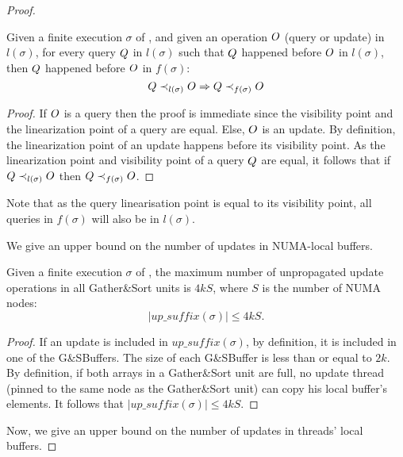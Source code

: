 \begin{proof}
\begin{lemma}\label{Lem: op_order}
Given a finite execution $\sigma$ of \mysketch, and given an operation $\mathnormal{O}$ (query or update) in $l(\sigma)$, for every query $\mathnormal{Q}$ in $l(\sigma)$ such that $\mathnormal{Q}$ happened before $\mathnormal{O}$ in \(l(\sigma)\), then $\mathnormal{Q}$ happened before $\mathnormal{O}$ in \(f(\sigma)\):  \[\mathnormal{Q} \prec_{l(\sigma)}\mathnormal{O} \Rightarrow  \mathnormal{Q} \prec_{f(\sigma)} \mathnormal{O}\]
\end{lemma}
\begin{proof}
If $\mathnormal{O}$ is a query then the proof is immediate since the visibility point and the linearization point of a query are equal. Else, $\mathnormal{O}$ is an update. By definition, the linearization point of an update happens before its visibility point. As the linearization point and visibility point of a query $\mathnormal{Q}$ are equal, it follows that if \(\mathnormal{Q} \prec_{l(\sigma)} \mathnormal{O}\) then \(\mathnormal{Q} \prec_{f(\sigma)} \mathnormal{O}\).
\end{proof}

Note that as the query linearisation point is equal to its visibility point, all queries in $f(\sigma)$ will also be in $l(\sigma)$. 

We give an upper bound on the number of updates in NUMA-local buffers.

\begin{lemma}\label{Lem: GSBuffer_updates_num}
Given a finite execution $\sigma$ of \mysketch, the maximum number of unpropagated update operations in all Gather\&Sort units is \(4kS\), where $S$ is the number of NUMA nodes: \[|\mathit{up\_suffix}(\sigma)| \leq 4kS.\]
\end{lemma}
\begin{proof}
If an update is included in \(\mathit{up\_suffix}(\sigma)\), by definition, it is included in one of the G\&SBuffers. The size of each G\&SBuffer is less than or equal to $2k$. By definition, if both arrays in a Gather\&Sort unit are full, no update thread (pinned to the same node as the Gather\&Sort unit) can copy his local buffer's elements. It follows that \(|\mathit{up\_suffix}(\sigma)| \leq 4kS\).
\end{proof}

Now, we give an upper bound on the number of updates in threads' local buffers.


\end{proof}
